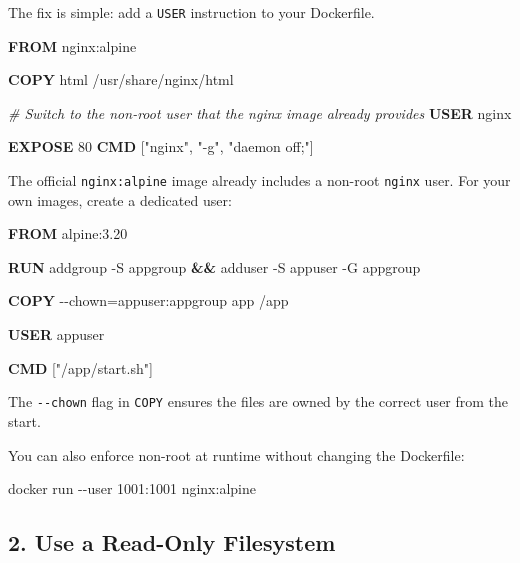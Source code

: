 \documentclass[11pt,american,a4paper,openany]{book}
\newenvironment{Shaded}{}{}
\newcommand{\AttributeTok}[1]{\textcolor[rgb]{0.49,0.56,0.16}{#1}}
\newcommand{\CommentTok}[1]{\textcolor[rgb]{0.38,0.63,0.69}{\textit{#1}}}
\newcommand{\ExtensionTok}[1]{#1}
\newcommand{\KeywordTok}[1]{\textcolor[rgb]{0.00,0.44,0.13}{\textbf{#1}}}
\newcommand{\NormalTok}[1]{#1}
\newcommand{\OperatorTok}[1]{\textcolor[rgb]{0.40,0.40,0.40}{#1}}
\newcommand{\StringTok}[1]{\textcolor[rgb]{0.25,0.44,0.63}{#1}}
\begin{document}
The fix is simple: add a \texttt{USER} instruction to your Dockerfile.

\begin{Shaded}
\begin{Highlighting}[]
\KeywordTok{FROM}\NormalTok{ nginx:alpine}

\KeywordTok{COPY}\NormalTok{ html /usr/share/nginx/html}

\CommentTok{\# Switch to the non{-}root user that the nginx image already provides}
\KeywordTok{USER}\NormalTok{ nginx}

\KeywordTok{EXPOSE}\NormalTok{ 80}
\KeywordTok{CMD}\NormalTok{ [}\StringTok{"nginx"}\NormalTok{, }\StringTok{"{-}g"}\NormalTok{, }\StringTok{"daemon off;"}\NormalTok{]}
\end{Highlighting}
\end{Shaded}

The official \texttt{nginx:alpine} image already includes a non-root
\texttt{nginx} user. For your own images, create a dedicated user:

\begin{Shaded}
\begin{Highlighting}[]
\KeywordTok{FROM}\NormalTok{ alpine:3.20}

\KeywordTok{RUN} \ExtensionTok{addgroup} \AttributeTok{{-}S}\NormalTok{ appgroup }\KeywordTok{\&\&} \ExtensionTok{adduser} \AttributeTok{{-}S}\NormalTok{ appuser }\AttributeTok{{-}G}\NormalTok{ appgroup}

\KeywordTok{COPY} \OperatorTok{{-}{-}chown=appuser:appgroup}\NormalTok{ app /app}

\KeywordTok{USER}\NormalTok{ appuser}

\KeywordTok{CMD}\NormalTok{ [}\StringTok{"/app/start.sh"}\NormalTok{]}
\end{Highlighting}
\end{Shaded}

The \texttt{-\/-chown} flag in \texttt{COPY} ensures the files are owned
by the correct user from the start.

You can also enforce non-root at runtime without changing the
Dockerfile:

\begin{Shaded}
\begin{Highlighting}[]
\NormalTok{docker run {-}{-}user 1001:1001 nginx:alpine}
\end{Highlighting}
\end{Shaded}

\subsection{2. Use a Read-Only
Filesystem}\label{use-a-read-only-filesystem}
\end{document}
